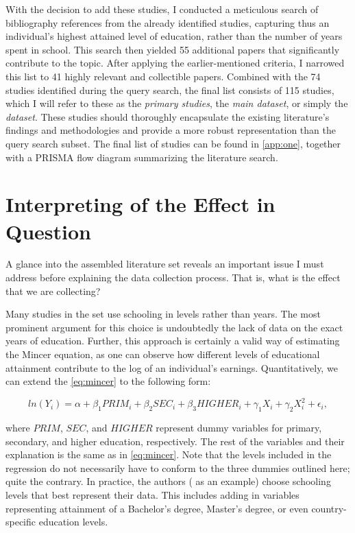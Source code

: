 With the decision to add these studies, I conducted a meticulous search of bibliography references from the already identified studies, capturing thus an individual's highest attained level of education, rather than the number of years spent in school. This search then yielded 55 additional papers that significantly contribute to the topic. After applying the earlier-mentioned criteria, I narrowed this list to 41 highly relevant and collectible papers. Combined with the 74 studies identified during the query search, the final list consists of 115 studies, which I will refer to these as the \textit{primary studies}, the \textit{main dataset}, or simply the \textit{dataset}. These studies should thoroughly encapsulate the existing literature's findings and methodologies and provide a more robust representation than the query search subset. The final list of studies can be found in \autoref{app:one}, together with a PRISMA flow diagram summarizing the literature search.

\section{Interpreting of the Effect in Question}
\label{sec:effect_meaning}

A glance into the assembled literature set reveals an important issue I must address before explaining the data collection process. That is, what is the effect that we are collecting?

Many studies in the set \citep{sackey2008private, leigh2008returns, bartolj2013evolution} use schooling in levels rather than years. The most prominent argument for this choice is undoubtedly the lack of data on the exact years of education. Further, this approach is certainly a valid way of estimating the Mincer equation, as one can observe how different levels of educational attainment contribute to the log of an individual's earnings. Quantitatively, we can extend the \autoref{eq:mincer} to the following form:

\begin{equation}
   \label{eq:mincer_levels}
   ln(Y_i) = \alpha + \beta_{1}PRIM_i + \beta_{2}SEC_i + \beta_{3}HIGHER_i + \gamma_{1}X_i + \gamma_{2}X_{i}^2 + \epsilon_i,
\end{equation}

where $PRIM$, $SEC$, and $HIGHER$ represent dummy variables for primary, secondary, and higher education, respectively. The rest of the variables and their explanation is the same as in \autoref{eq:mincer}. Note that the levels included in the regression do not necessarily have to conform to the three dummies outlined here; quite the contrary. In practice, the authors (\cite{gill2000community} as an example) choose schooling levels that best represent their data. This includes adding in variables representing attainment of a Bachelor's degree, Master's degree, or even country-specific education levels.

